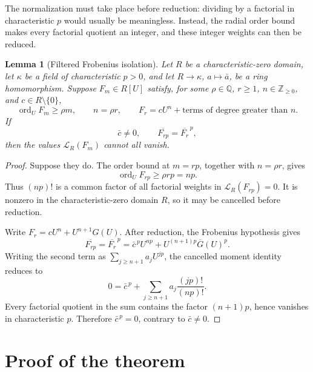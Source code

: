 \documentclass[11pt]{article}
\newtheorem{lemma}[theorem]{Lemma}
\newcommand{\ord}{\operatorname{ord}}
\begin{document}
The normalization must take place before reduction: dividing by a
factorial in characteristic \(p\) would usually be meaningless.  Instead,
the radial order bound makes every factorial quotient an integer, and
these integer weights can then be reduced.

\begin{lemma}[Filtered Frobenius isolation]
\label{lem:filtered-frobenius}
Let \(R\) be a characteristic-zero domain, let \(\kappa\) be a field of
characteristic \(p>0\), and let \(R\to\kappa\), \(a\mapsto\bar a\), be a
ring homomorphism.  Suppose \(F_m\in R[U]\) satisfy, for some
\(\rho\in\mathbb Q\), \(r\geq1\), \(n\in\mathbb Z_{\geq0}\), and
\(c\in R\setminus\{0\}\),
\[
  \ord_UF_m\geq\rho m,\qquad
  n=\rho r,\qquad
  F_r=cU^n+\text{terms of degree greater than }n.
\]
If
\[
  \bar c\neq0,\qquad
  \overline{F_{rp}}=\overline{F_r}^{\,p},
\]
then the values \(\mathcal L_R(F_m)\) cannot all vanish.
\end{lemma}

\begin{proof}
Suppose they do.  The order bound at \(m=rp\), together with
\(n=\rho r\), gives
\[
  \ord_UF_{rp}\geq \rho rp=np.
\]
Thus \((np)!\) is a common factor of all factorial weights in
\(\mathcal L_R(F_{rp})=0\).  It is nonzero in the characteristic-zero
domain \(R\), so it may be cancelled before reduction.

Write \(F_r=cU^n+U^{n+1}G(U)\).  After reduction, the Frobenius hypothesis
gives
\[
  \overline{F_{rp}}
  =\overline{F_r}^{\,p}
  =\bar c^{\,p}U^{np}+U^{(n+1)p}\overline{G}(U)^p.
\]
Writing the second term as
\(\sum_{j\geq n+1}a_jU^{jp}\), the cancelled moment identity reduces to
\[
  0=\bar c^{\,p}
    +\sum_{j\geq n+1}a_j\frac{(jp)!}{(np)!}.
\]
Every factorial quotient in the sum contains the factor \((n+1)p\), hence
vanishes in characteristic \(p\).  Therefore \(\bar c^{\,p}=0\), contrary
to \(\bar c\neq0\).
\end{proof}

\section{Proof of the theorem}
\end{document}
